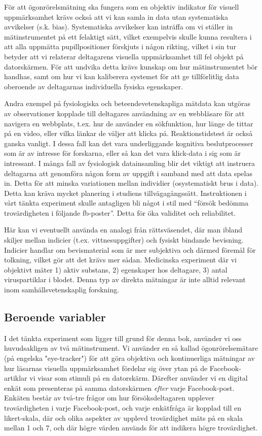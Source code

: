 \documentclass[
]{book}
\begin{document}
För att ögonrörelsmätning ska fungera som en objektiv indikator för visuell uppmärksamhet krävs också att vi kan samla in data utan systematiska avvikelser (s.k. bias). Systematiska avvikelser kan inträffa om vi ställer in mätinstrumentet på ett felaktigt sätt, vilket exempelvis skulle kunna resultera i att alla uppmätta pupillpositioner förskjuts i någon rikting, vilket i sin tur betyder att vi relaterar deltagarens visuella uppmärksamhet till fel objekt på datorskärmen. För att undvika detta krävs kunskap om hur mätinstrumentet bör handhas, samt om hur vi kan kaliberera systemet för att ge tillförlitlig data oberoende av deltagarnas individuella fysiska egenskaper.

Andra exempel på fysiologiska och beteendevetenskapliga mätdata kan utgöras av observationer kopplade till deltagares användning av en webbläsare för att navigera en webbplats, t.ex. hur de använder en sökfunktion, hur länge de tittar på en video, eller vilka länkar de väljer att klicka på. Reaktionstidstest är också ganska vanligt. I dessa fall kan det vara underliggande kognitiva beslutprocesser som är av intresse för forskarna, eller så kan det vara klick-data i sig som är intressant. I många fall av fysiologisk datainsamling blir det viktigt att instruera deltagarna att genomföra någon form av uppgift i samband med att data spelas in. Detta för att minska variationen mellan individier (osystematiskt brus i data). Detta kan kräva mycket planering i studiens tillvägagångssätt. Instruktionen i vårt tänkta experiment skulle antagligen bli något i stil med ``försök bedömma trovärdigheten i följande fb-poster''. Detta för öka validitet och reliabilitet.

Här kan vi eventuellt använda en analogi från rättsväsendet, där man ibland skiljer mellan indicier (t.ex. vittnesuppgifter) och fysiskt bindande bevisning. Indicier handlar om bevismaterial som är mer subjektiva och därmed föremål för tolkning, vilket gör att det krävs mer sådan. Medicinska experiment där vi objektivt mäter 1) aktiv substans, 2) egenskaper hos deltagare, 3) antal viruspartiklar i blodet. Denna typ av direkta mätningar är inte alltid relevant inom samhällsvetenskaplig forskning.

\hypertarget{sub07.3.4}{%
\subsection{Beroende variabler}\label{sub07.3.4}}

I det tänkta experiment som ligger till grund för denna bok, använder vi oss huvudsakligen av två mätinstrument. Vi använder en så kallad ögonrörelsemätare (på engelska "eye-tracker") för att göra objektiva och kontinuerliga mätningar av hur läsarnas visuella uppmärksamhet fördelar sig över ytan på de Facebook-artiklar vi visar som stimuli på en datorskärm. Därefter använder vi en digital enkät som presenteras på samma datorskärmen \emph{efter} varje Facebook-post. Enkäten består av två-tre frågor om hur försöksdeltagaren upplever trovärdigheten i varje Facebook-post, och varje enkätfråga är kopplad till en likert-skala, där och olika aspekter av upplevd trovärdighet mäts på en skala mellan 1 och 7, och där högre värden används för att indikera högre trovärdighet.
\end{document}
